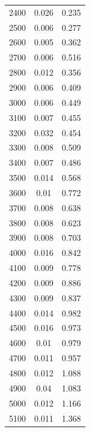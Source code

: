 \documentclass{article}
\begin{document}
\begin{longtable}{c|c|c}
             2400 &        0.026 &           0.235 \\
             2500 &        0.006 &           0.277 \\
             2600 &        0.005 &           0.362 \\
             2700 &        0.006 &           0.516 \\
             2800 &        0.012 &           0.356 \\
             2900 &        0.006 &           0.409 \\
             3000 &        0.006 &           0.449 \\
             3100 &        0.007 &           0.455 \\
             3200 &        0.032 &           0.454 \\
             3300 &        0.008 &           0.509 \\
             3400 &        0.007 &           0.486 \\
             3500 &        0.014 &           0.568 \\
             3600 &        0.01  &           0.772 \\
             3700 &        0.008 &           0.638 \\
             3800 &        0.008 &           0.623 \\
             3900 &        0.008 &           0.703 \\
             4000 &        0.016 &           0.842 \\
             4100 &        0.009 &           0.778 \\
             4200 &        0.009 &           0.886 \\
             4300 &        0.009 &           0.837 \\
             4400 &        0.014 &           0.982 \\
             4500 &        0.016 &           0.973 \\
             4600 &        0.01  &           0.979 \\
             4700 &        0.011 &           0.957 \\
             4800 &        0.012 &           1.088 \\
             4900 &        0.04  &           1.083 \\
             5000 &        0.012 &           1.166 \\
             5100 &        0.011 &           1.368 \\

\end{longtable}
\end{document}

